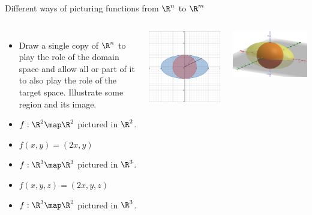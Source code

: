 \documentclass{beamer}
\begin{document}
\begin{frame}{Different ways of picturing functions from $\R^n$ to $\R^m$}

\begin{columns}
\column[T]{5cm}
\begin{itemize}
\item Draw a single copy of $\R^n$ to play the role of the domain space
and allow all or part of it to also play the role of the target space.
Illustrate some region and its image.
\item $f:\R^2\map\R^2$ pictured in $\R^2$.
\item $f(x,y) = (2x, y)$
\item $f:\R^3\map\R^3$ pictured in $\R^3$.
\item $f(x,y, z) = (2x, y, z)$
\item $f:\R^3\map\R^2$ pictured in $\R^3$.
\end{itemize}

\column[T]{5cm}
\includegraphics[scale=0.1]{circle-to-ellipse}

\includegraphics[scale=0.15]{sphere-to-ellipsoid}


\end{columns}
\end{frame}
\end{document}
